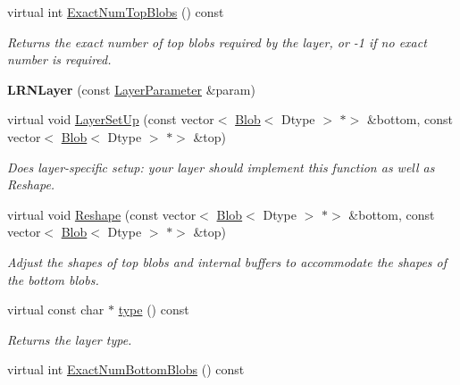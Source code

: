 \begin{DoxyCompactItemize}
virtual int \mbox{\hyperlink{classcaffe_1_1_l_r_n_layer_ac0ee88b119c38749c50e914521cdc148}{Exact\+Num\+Top\+Blobs}} () const
\begin{DoxyCompactList}\small\item\em Returns the exact number of top blobs required by the layer, or -\/1 if no exact number is required. \end{DoxyCompactList}\item 
\mbox{\label{classcaffe_1_1_l_r_n_layer_a235b5f1b8fead8d1ddb9c29d627058fe}} 
{\bfseries L\+R\+N\+Layer} (const \mbox{\hyperlink{classcaffe_1_1_layer_parameter}{Layer\+Parameter}} \&param)
\item 
virtual void \mbox{\hyperlink{classcaffe_1_1_l_r_n_layer_a4fa3b333b55b43e28534905bec151e09}{Layer\+Set\+Up}} (const vector$<$ \mbox{\hyperlink{classcaffe_1_1_blob}{Blob}}$<$ Dtype $>$ $\ast$$>$ \&bottom, const vector$<$ \mbox{\hyperlink{classcaffe_1_1_blob}{Blob}}$<$ Dtype $>$ $\ast$$>$ \&top)
\begin{DoxyCompactList}\small\item\em Does layer-\/specific setup\+: your layer should implement this function as well as Reshape. \end{DoxyCompactList}\item 
virtual void \mbox{\hyperlink{classcaffe_1_1_l_r_n_layer_a5dd9938f40f479d6fd1de59becd09bdf}{Reshape}} (const vector$<$ \mbox{\hyperlink{classcaffe_1_1_blob}{Blob}}$<$ Dtype $>$ $\ast$$>$ \&bottom, const vector$<$ \mbox{\hyperlink{classcaffe_1_1_blob}{Blob}}$<$ Dtype $>$ $\ast$$>$ \&top)
\begin{DoxyCompactList}\small\item\em Adjust the shapes of top blobs and internal buffers to accommodate the shapes of the bottom blobs. \end{DoxyCompactList}\item 
\mbox{\label{classcaffe_1_1_l_r_n_layer_aaa924f8eed5e6300efdb6bc594a29497}} 
virtual const char $\ast$ \mbox{\hyperlink{classcaffe_1_1_l_r_n_layer_aaa924f8eed5e6300efdb6bc594a29497}{type}} () const
\begin{DoxyCompactList}\small\item\em Returns the layer type. \end{DoxyCompactList}\item 
virtual int \mbox{\hyperlink{classcaffe_1_1_l_r_n_layer_a32be44f9f361d29f05261bd174d92321}{Exact\+Num\+Bottom\+Blobs}} () const

\end{DoxyCompactItemize}
